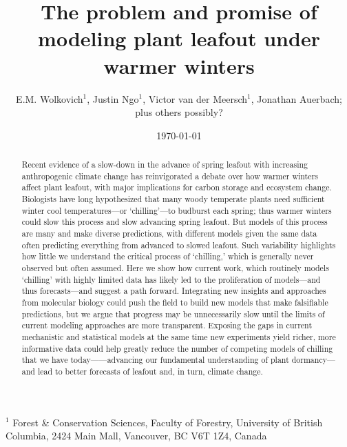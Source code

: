 \documentclass[11pt]{article}
\begin{document}
\renewcommand{\refname}{\CHead{}}


\title{The problem and promise of \\ modeling plant leafout under warmer winters} %
\author{E.M. Wolkovich$^1$, Justin Ngo$^1$, Victor van der Meersch$^1$, Jonathan Auerbach; \\ plus others possibly?} %
\date{\today}
\maketitle

$^1$ Forest \& Conservation Sciences, Faculty of Forestry, University of British Columbia, 2424 Main Mall, Vancouver, BC V6T 1Z4, Canada\\


\begin{abstract} %
Recent evidence of a slow-down in the advance of spring leafout with increasing anthropogenic climate change has reinvigorated a debate over how warmer winters affect plant leafout, with major implications for carbon storage and ecosystem change. Biologists have long hypothesized that many woody temperate plants need sufficient winter cool temperatures---or `chilling'---to budburst each spring; thus warmer winters could slow this process and slow advancing spring leafout. But models of this process are many and make diverse predictions, with different models given the same data often predicting everything from advanced to slowed leafout. Such variability highlights how little we understand the critical process of `chilling,' which is generally never observed but often assumed. Here we show how current work, which routinely models `chilling' with highly limited data has likely led to the proliferation of models---and thus forecasts---and suggest a path forward. Integrating new insights and approaches from molecular biology could push the field to build new models that make falsifiable predictions, but we argue that progress may be unnecessarily slow until the limits of current modeling approaches are more transparent. Exposing the gaps in current mechanistic and statistical models at the same time new experiments yield richer, more informative data could help greatly reduce the number of competing models of chilling that we have today------advancing our fundamental understanding of plant dormancy---and lead to better forecasts of leafout and, in turn, climate change. 
\end{abstract}
\end{document}
